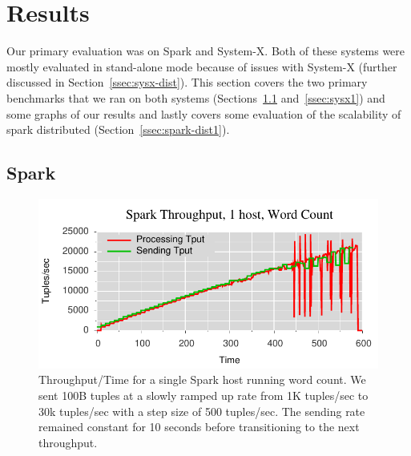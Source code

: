 \section{Results}

Our primary evaluation was on Spark and System-X. Both of these systems were
mostly evaluated in stand-alone mode because of issues with System-X (further
discussed in Section~\ref{ssec:sysx-dist}). This section covers the two primary
benchmarks that we ran on both systems (Sections~\ref{ssec:spark1}
and~\ref{ssec:sysx1}) and some graphs of our results and lastly covers some
evaluation of the scalability of spark distributed
(Section~\ref{ssec:spark-dist1}).

\subsection{Spark}
\label{ssec:spark1}

\begin{figure}[t]
\centering
\includegraphics[width=1\linewidth]{figures/sp1_tput.pdf}
\caption{Throughput/Time for a single Spark host running word count. We sent 100B tuples at a
slowly ramped up rate from 1K tuples/sec to 30k tuples/sec with a step size of
500 tuples/sec. The sending rate remained constant for 10 seconds before
transitioning to the next throughput.}
\label{fig:sp1-tput}
\end{figure}

